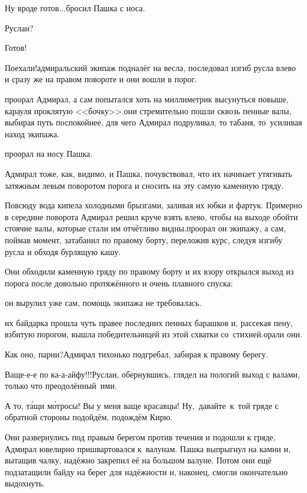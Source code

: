 \diagdash Ну вроде готов$\ldots$\mdash бросил Пашка с носа.

\diagdash Руслан?

\diagdash Готов!

\diagdash Поехали!\mdash адмиральский экипаж подналёг на весла, последовал изгиб русла влево и сразу же на правом повороте и они вошли в порог.

\mdash проорал Адмирал, а сам попытался хоть на миллиметрик высунуться повыше, карауля проклятую <<бочку>>.\mdash они стремительно пошли сквозь пенные валы, выбирая путь поспокойнее, для чего Адмирал подруливал, то табаня, то~усиливая наход экипажа. 

\mdash проорал на носу Пашка.

\mdash Адмирал тоже, как, видимо, и Пашка, почувствовал, что их начинает утягивать затяжным левым поворотом порога и сносить на эту самую каменную гряду. 

Повсюду вода кипела холодными брызгами, заливая их юбки и фартук. Примерно в середине поворота Адмирал решил круче взять влево, чтобы на выходе обойти стоячие валы, которые стали им отчётливо видны.\mdash проорал он экипажу, а сам, поймав момент, затабанил по правому борту, переложив курс, следуя изгибу русла и обходя бурлящую кашу. 

Они обходили каменную гряду по правому борту и их взору открылся выход из порога после довольно протяжённого и очень плавного спуска: 

\mdash он вырулил уже сам, помощь экипажа не требовалась.

\mdash их байдарка прошла чуть правее последних пенных барашков и, рассекая пену, взбитую порогом, вышла победительницей из этой схватки со~стихией.\mdash орали они.

\diagdash Как оно, парни?\mdash Адмирал тихонько подгребал, забирая к правому берегу.

\diagdash Ваще-е-е по ка-а-айфу!!!\mdash Руслан, обернувшись, глядел на пологий выход с валами, только что преодолённый~ими.

\diagdash А то, т\'{а}щи м\'{о}тросы! Вы у меня ваще красавцы! Ну,~давайте~к~той гряде с обратной стороны подойдём, подождём Кирю.

Они развернулись под правым берегом против течения и подошли к гряде, Адмирал ювелирно пришвартовался к~валунам. Пашка выпрыгнул на камни и, вытащив чалку, надёжно закрепил её на большом валуне. Потом они ещё подзатащили байду на берег для надёжности и, наконец, смогли окончательно выдохнуть.

